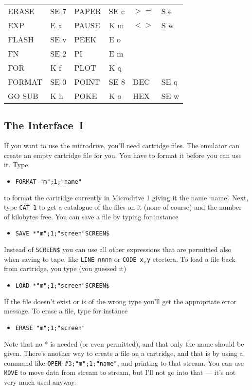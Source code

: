\begin{tabular}{|ll|ll|ll|}
   ERASE    &  SE 7 & PAPER   &  SE c & $>=$    &  S e  \\
   EXP      &  E x  & PAUSE   &  K m  & $<>$    &  S w  \\
   FLASH    &  SE v & PEEK    &  E o  &         &       \\
   FN       &  SE 2 & PI      &  E m  &         &       \\
   FOR      &  K f  & PLOT    &  K q  &         &       \\
   FORMAT   &  SE 0 & POINT   &  SE 8 & DEC     &  SE q \\
   GO SUB   &  K h  & POKE    &  K o  & HEX     &  SE w \\
\hline
\end{tabular}




\subsection{The Interface~I}

    If you want to use the microdrive, you'll need cartridge files.  The
    emulator can create an empty cartridge file for you.  You have to format
    it before you can use it.  Type
\begin{itemize}
  \item[] \verb|FORMAT "m";1;"name"|
\end{itemize}
    to format the cartridge currently in Microdrive 1 giving it the name
    `name'.  Next, type \verb|CAT 1| to get a catalogue of the files on it
    (none of
    course) and the number of kilobytes free.  You can save a file by typing
    for instance
\begin{itemize}
  \item[] \verb|SAVE *"m";1;"screen"SCREEN$|
\end{itemize}
    Instead of \verb|SCREEN$| you can use all other expressions that are
    permitted
    also when saving to tape, like \verb|LINE nnnn| or \verb|CODE x,y|
    etcetera. To load a file back from cartridge, you type (you guessed it)
\begin{itemize}
  \item[] \verb|LOAD *"m";1;"screen"SCREEN$|
\end{itemize}
    If the file doesn't exist or is of the wrong type you'll get the
    appropriate error message.  To erase a file, type for instance
\begin{itemize}
  \item[] \verb|ERASE "m";1;"screen"|
\end{itemize}
    Note that no * is needed (or even permitted), and that only the name
    should be given.  There's another way to create a file on a cartridge,
    and that is by using a command like \verb|OPEN #3;"m";1;"name"|,
    and printing to that stream.  You can use \verb|MOVE| to move
    data from stream to stream,
    but I'll not go into that --- it's not very much used anyway.

